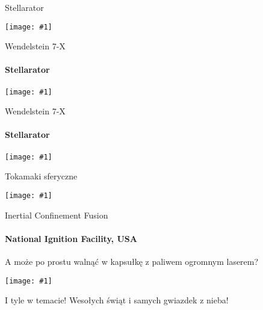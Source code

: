 \documentclass{beamer}
\newcommand {\framedgraphic}[1] {
        \begin{center}
            \texttt{[image: \#1]}
        \end{center}
}
\begin{document}
\begin{frame}[t]{Stellarator}
  \framedgraphic{img/Wendelstein}
\end{frame}

\begin{frame}[t]{Wendelstein 7-X}
  \framesubtitle{Stellarator}
  \framedgraphic{img/wendelstein_magsurfaces}
\end{frame}

\begin{frame}[t]{Wendelstein 7-X}
  \framesubtitle{Stellarator}
  \framedgraphic{img/w7x-diag}
\end{frame}

\begin{frame}[t]{Tokamaki sferyczne}
  \framedgraphic{img/spherical_tokamak}
\end{frame}

\begin{frame}[t]{Inertial Confinement Fusion}
  \framesubtitle{National Ignition Facility, USA}
  A może po prostu walnąć w kapsułkę z paliwem ogromnym laserem?
  \pause
  \framedgraphic{img/NIF_fuel}
\end{frame}

\begin{frame}[t]{I tyle w temacie!}
  Wesołych świąt i samych gwiazdek z nieba!
\end{frame}
\end{document}
